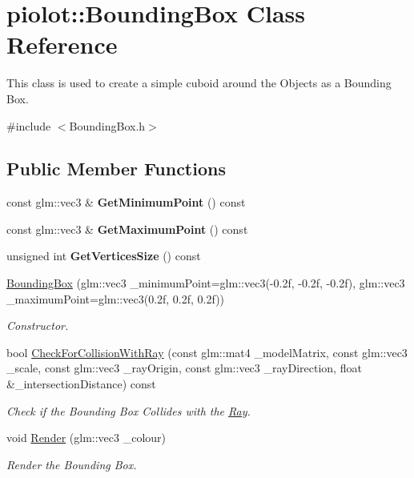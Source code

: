 \hypertarget{classpiolot_1_1_bounding_box}{}\section{piolot\+:\+:Bounding\+Box Class Reference}
\label{classpiolot_1_1_bounding_box}


This class is used to create a simple cuboid around the Objects as a Bounding Box.  




{\ttfamily \#include $<$Bounding\+Box.\+h$>$}

\subsection*{Public Member Functions}
\begin{DoxyCompactItemize}
\item 
const glm\+::vec3 \& {\bfseries Get\+Minimum\+Point} () const
\item 
const glm\+::vec3 \& {\bfseries Get\+Maximum\+Point} () const
\item 
unsigned int {\bfseries Get\+Vertices\+Size} () const
\item 
\mbox{\hyperlink{group___getters_ga699e27e8e646be7a0a47f89abb35778d}{Bounding\+Box}} (glm\+::vec3 \+\_\+minimum\+Point=glm\+::vec3(-\/0.\+2f, -\/0.\+2f, -\/0.\+2f), glm\+::vec3 \+\_\+maximum\+Point=glm\+::vec3(0.\+2f, 0.\+2f, 0.\+2f))
\begin{DoxyCompactList}\small\item\em Constructor. \end{DoxyCompactList}\item 
bool \mbox{\hyperlink{group___getters_ga552fcdb461cdc71c5da0fed7b486246d}{Check\+For\+Collision\+With\+Ray}} (const glm\+::mat4 \+\_\+model\+Matrix, const glm\+::vec3 \+\_\+scale, const glm\+::vec3 \+\_\+ray\+Origin, const glm\+::vec3 \+\_\+ray\+Direction, float \&\+\_\+intersection\+Distance) const
\begin{DoxyCompactList}\small\item\em Check if the Bounding Box Collides with the \mbox{\hyperlink{classpiolot_1_1_ray}{Ray}}. \end{DoxyCompactList}\item 
void \mbox{\hyperlink{group___getters_ga3ef9f966674be7fa0448d388b7a3d776}{Render}} (glm\+::vec3 \+\_\+colour)
\begin{DoxyCompactList}\small\item\em Render the Bounding Box. \end{DoxyCompactList}\end{DoxyCompactItemize}
